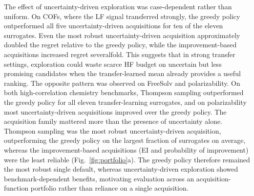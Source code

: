 \documentclass[11pt,a4paper]{article}%
\begin{document}
The effect of uncertainty-driven exploration was case-dependent rather than uniform. On COFs, where the LF
signal transferred strongly,
 the greedy policy outperformed all five uncertainty-driven acquisitions for ten of the eleven
surrogates. Even the most robust uncertainty-driven acquisition approximately doubled the regret relative to the greedy policy, while the
improvement-based acquisitions increased regret severalfold. This suggests that in strong transfer settings, exploration could waste scarce
HF budget on uncertain but less promising candidates when the transfer-learned
mean already provides a useful ranking. The opposite pattern was observed on FreeSolv and polarizability. On both high-correlation chemistry
benchmarks, Thompson sampling outperformed the greedy policy for all eleven transfer-learning
surrogates, and on polarizability most 
uncertainty-driven acquisitions improved over the greedy policy. The acquisition family mattered more than the presence
of uncertainty alone. Thompson sampling was the most robust uncertainty-driven acquisition,
outperforming the greedy policy on the largest fraction of surrogates on average, whereas the
improvement-based acquisitions (EI and probability of improvement) were the least reliable (Fig.~\ref{fig:portfolio}a).
The greedy policy therefore remained the most robust single default,
whereas uncertainty-driven exploration showed benchmark-dependent benefits, motivating evaluation across an acquisition-function
portfolio rather than reliance on a single acquisition.
\end{document}
